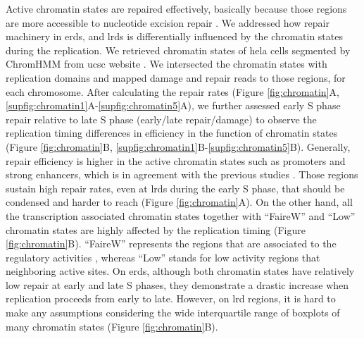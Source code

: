 Active chromatin states are repaired effectively, basically because those regions are more accessible to nucleotide excision repair \citep{adar2016genome}. We addressed how repair machinery in \gls{erd}s, and \gls{lrd}s is differentially influenced by the chromatin states during the replication. We retrieved chromatin states of \gls{hela} cells segmented by ChromHMM from \gls{ucsc} website \citep{ernst2017chromatin}. We intersected the chromatin states with replication domains and mapped damage and repair reads to those regions, for each chromosome. After calculating the repair rates (Figure \ref{fig:chromatin}A, \ref{supfig:chromatin1}A-\ref{supfig:chromatin5}A), we further assessed early S phase repair relative to late S phase (early/late repair/damage) to observe the replication timing differences in efficiency in the function of chromatin states (Figure \ref{fig:chromatin}B, \ref{supfig:chromatin1}B-\ref{supfig:chromatin5}B). Generally, repair efficiency is higher in the active chromatin states such as promoters and strong enhancers, which is in agreement with the previous studies \citep{adar2016genome, hu2016cisplatin}. Those regions sustain high repair rates, even at \gls{lrd}s during the early S phase, that should be condensed and harder to reach (Figure  \ref{fig:chromatin}A). On the other hand, all the transcription associated chromatin states together with “FaireW” and “Low” chromatin states are highly affected by the replication timing (Figure  \ref{fig:chromatin}B). “FaireW” represents the regions that are associated to the regulatory activities \citep{giresi2007faire}, whereas “Low” stands for low activity regions that neighboring active sites. On \gls{erd}s, although both chromatin states have relatively low repair at early and late S phases, they demonstrate a drastic increase when replication proceeds from early to late.  However, on \gls{lrd} regions, it is hard to make any assumptions considering the wide interquartile range of boxplots of many chromatin states (Figure  \ref{fig:chromatin}B).

